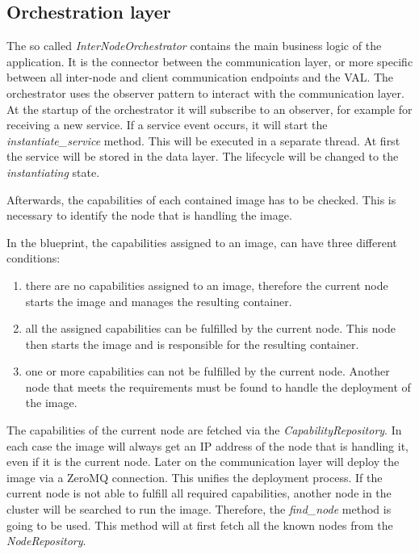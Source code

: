 \subsection{Orchestration layer}
The so called \textit{InterNodeOrchestrator} contains the main business logic of the application.
It is the connector between the communication layer, or more specific between all inter-node and client communication endpoints and the \ac{VAL}.
The orchestrator uses the observer pattern to interact with the communication layer.
At the startup of the orchestrator it will subscribe to an observer, for example for receiving a new service.
If a service event occurs, it will start the \textit{instantiate\_service} method.
This will be executed in a separate thread.
At first the service will be stored in the data layer.
The lifecycle will be changed to the \textit{instantiating} state.\newline

Afterwards, the capabilities of each contained image has to be checked.
This is necessary to identify the node that is handling the image.\newline

In the blueprint, the capabilities assigned to an image, can have three different conditions:
\begin{enumerate}
  \item there are no capabilities assigned to an image, therefore the current node starts the image and manages the resulting container.
  \item all the assigned capabilities can be fulfilled by the current node. This node then starts the image and is responsible for the resulting container.
  \item one or more capabilities can not be fulfilled by the current node. Another node that meets the requirements must be found to handle the deployment of the image.
\end{enumerate}
\bigskip

The capabilities of the current node are fetched via the \textit{CapabilityRepository}.
In each case the image will always get an \ac{IP} address of the node that is handling it, even if it is the current node.
Later on the communication layer will deploy the image via a ZeroMQ connection.
This unifies the deployment process.
If the current node is not able to fulfill all required capabilities, another node in the cluster will be searched to run the image.
Therefore, the \textit{find\_node} method is going to be used.
This method will at first fetch all the known nodes from the \textit{NodeRepository}.\newline

